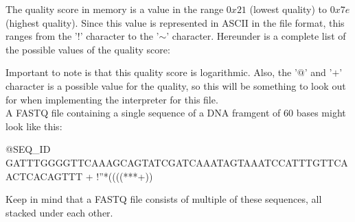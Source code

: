 The quality score in memory is a value in the range $0x21$ (lowest quality) to $0x7e$ (highest quality). Since this value is represented in ASCII in the file format, this ranges from the '$!$' character to the '$\mathtt{\sim}$' character. Hereunder is a complete list of the possible values of the quality score:

\begin{lcverbatim}
!"#$%
[\]^_`abcdefghijklmnopqrstuvwxyz{|}~
\end{lcverbatim}


Important to note is that this quality score is logarithmic. Also, the '$@$' and '$+$' character is a possible value for the quality, so this will be something to look out for when implementing the interpreter for this file.\\


A FASTQ file containing a single sequence of a DNA framgent of 60 bases might look like this:


\begin{lcverbatim}
@SEQ_ID
GATTTGGGGTTCAAAGCAGTATCGATCAAATAGTAAATCCATTTGTTCAACTCACAGTTT
+
!''*((((***+))%
\end{lcverbatim}

Keep in mind that a FASTQ file consists of multiple of these sequences, all stacked under each other.


